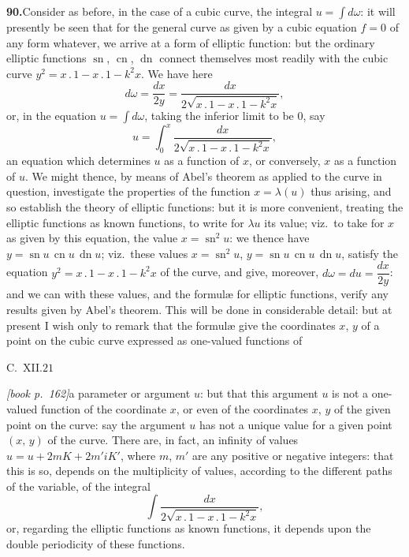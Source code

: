 \documentclass[11pt,a4paper]{article}
\DeclareMathOperator{\sn}{sn}
\DeclareMathOperator{\cn}{cn}
\DeclareMathOperator{\dn}{dn}
\begin{document}
\medskip\noindent\textbf{90.}\quad Consider as before, in the case of a cubic curve, the integral $u = \int d\omega$: it will presently be seen that for the general curve as given by a cubic equation $f = 0$ of any form whatever, we arrive at a form of elliptic function: but the ordinary elliptic functions $\sn$, $\cn$, $\dn$ connect themselves most readily with the cubic curve $y^2 = x\,.\,1 - x\,.\,1 - k^2 x$. We have here
\[
d\omega = \frac{dx}{2y} = \frac{dx}{2\sqrt{x\,.\,1 - x\,.\,1 - k^2 x}},
\]
or, in the equation $u = \int d\omega$, taking the inferior limit to be $0$, say
\[
u = \int_0^x\!\frac{dx}{2\sqrt{x\,.\,1 - x\,.\,1 - k^2 x}},
\]
an equation which determines $u$ as a function of $x$, or conversely, $x$ as a function of $u$. We might thence, by means of Abel's theorem as applied to the curve in question, investigate the properties of the function $x = \lambda(u)$ thus arising, and so establish the theory of elliptic functions: but it is more convenient, treating the elliptic functions as known functions, to write for $\lambda u$ its value; viz.\ to take for $x$ as given by this equation, the value $x = \sn^2 u$: we thence have $y = \sn u\,\cn u\,\dn u$; viz.\ these values $x = \sn^2 u$, $y = \sn u\,\cn u\,\dn u$, satisfy the equation $y^2 = x\,.\,1 - x\,.\,1 - k^2 x$ of the curve, and give, moreover, $d\omega = du = \dfrac{dx}{2y}$: and we can with these values, and the formul\ae{} for elliptic functions, verify any results given by Abel's theorem. This will be done in considerable detail: but at present I wish only to remark that the formul\ae{} give the coordinates $x$, $y$ of a point on the cubic curve expressed as one-valued functions of

\hfill C.\ XII.\hfill $21$

\medskip\noindent\textit{[book p.~162]}\quad a parameter or argument $u$: but that this argument $u$ is not a one-valued function of the coordinate $x$, or even of the coordinates $x$, $y$ of the given point on the curve: say the argument $u$ has not a unique value for a given point $(x,\,y)$ of the curve. There are, in fact, an infinity of values $u = u + 2mK + 2m'iK'$, where $m$, $m'$ are any positive or negative integers: that this is so, depends on the multiplicity of values, according to the different paths of the variable, of the integral
\[
\int\frac{dx}{2\sqrt{x\,.\,1 - x\,.\,1 - k^2 x}},
\]
or, regarding the elliptic functions as known functions, it depends upon the double periodicity of these functions.
\end{document}
